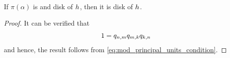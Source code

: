 \documentclass[../main.tex]{subfiles}
\begin{document}
  \begin{lemma}
    \label{lem:two_escaping_implies_ex}
    If $\pi\left( \alpha \right)$ is  and  disk of $h_{}$, 
    then it is \anex disk of $h_{}$.
  \end{lemma}
  \begin{proof}
    It can be verified that 
    \[
      1 = q_{n, m} q_{m, k} q_{k, n}
    \]
    and hence, the result follows from \cref{eq:mod_principal_units_condition}.

  \end{proof}
\end{document}
